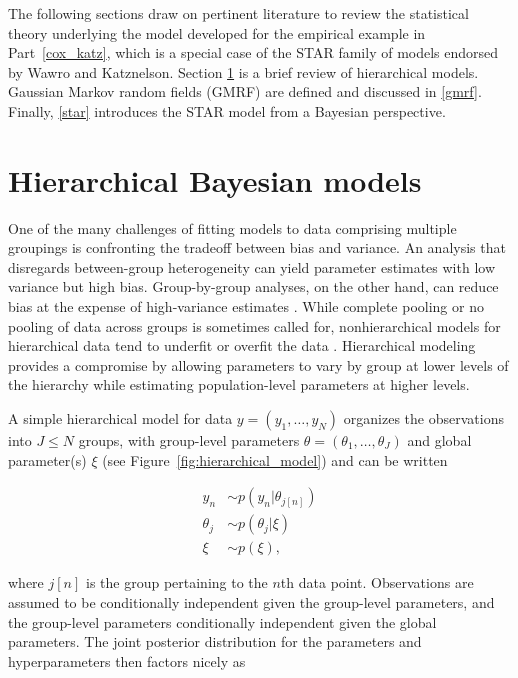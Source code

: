 The following sections draw on pertinent literature to review the statistical theory underlying 
the model developed for the empirical example in Part~\ref{cox_katz}, which is a special case 
of the STAR family of models endorsed by Wawro and Katznelson. Section \ref{hierarchical} is a brief review 
of hierarchical models. Gaussian Markov random fields (GMRF) are defined and discussed 
in \ref{gmrf}. Finally, \ref{star} introduces the STAR model from a Bayesian perspective. 



\section{Hierarchical Bayesian models}
\label{hierarchical}

One of the many challenges of fitting models to data comprising multiple groupings is 
confronting the tradeoff between bias and variance. An analysis that disregards between-group 
heterogeneity can yield parameter estimates with low variance but high bias. Group-by-group 
analyses, on the other hand, can reduce bias at the expense of high-variance estimates . While complete pooling or no pooling of data across 
groups is sometimes called for, nonhierarchical models for hierarchical data tend to underfit 
or overfit the data . Hierarchical modeling provides a 
compromise by allowing parameters to vary by group at lower levels of the hierarchy while 
estimating population-level parameters at higher levels. 

A simple hierarchical model for data $y = (y_1, \dots, y_N)$ organizes the observations into $J \leq N$ 
groups, with group-level parameters $\theta = (\theta_1, \dots, \theta_J)$ and global parameter(s) $\xi$ 
(see Figure~\ref{fig:hierarchical_model}) and can be written

\begin{align*}
y_n &\sim p(y_n | \theta_{j[n]}) \\
\theta_j &\sim p(\theta_j | \xi) \\
\xi &\sim p(\xi),
\end{align*}

\noindent where $j[n]$ is the group pertaining to the $n$th data point. Observations are assumed 
to be conditionally independent given the group-level parameters, and the group-level parameters 
conditionally independent given the global parameters. The joint posterior distribution for the 
parameters and hyperparameters then factors nicely as

